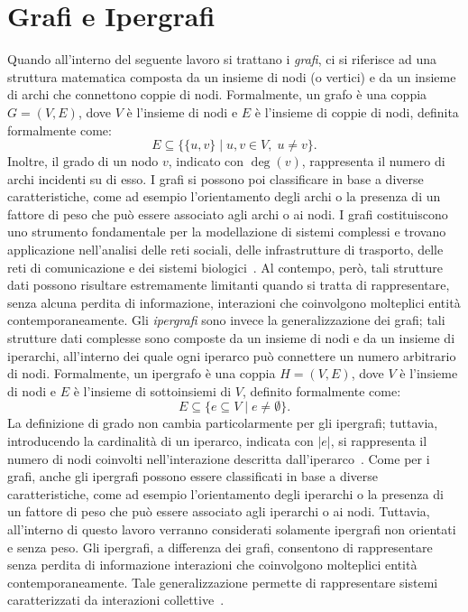 
\section{Grafi e Ipergrafi}\label{sec:grafi_e_ipergrafi}

Quando all'interno del seguente lavoro si trattano i \textit{grafi}, ci si riferisce ad una struttura matematica composta da un insieme di nodi (o vertici) e da un insieme di archi che connettono coppie di nodi.
Formalmente, un grafo è una coppia $G = (V, E)$, dove $V$ è l'insieme di nodi e $E$ è l'insieme di coppie di nodi, definita formalmente come:
\[
    E \subseteq \{\{u,v\} \mid u,v \in V,\; u \neq v\}.
\]
Inoltre, il grado di un nodo $v$, indicato con $\deg(v)$, rappresenta il numero di archi incidenti su di esso.
I grafi si possono poi classificare in base a diverse caratteristiche, come ad esempio l'orientamento degli archi o la presenza di un fattore di peso che può essere associato agli archi o ai nodi.
I grafi costituiscono uno strumento fondamentale per la modellazione di sistemi complessi e trovano applicazione nell'analisi delle reti sociali, delle infrastrutture di trasporto, delle reti di comunicazione e dei sistemi biologici~\cite{newman2018}.\newline
Al contempo, però, tali strutture dati possono risultare estremamente limitanti quando si tratta di rappresentare, senza alcuna perdita di informazione, interazioni che coinvolgono molteplici entità contemporaneamente.\newline
Gli \textit{ipergrafi} sono invece la generalizzazione dei grafi; tali strutture dati complesse sono composte da un insieme di nodi e da un insieme di iperarchi, all'interno dei quale ogni iperarco può connettere un numero arbitrario di nodi.
Formalmente, un ipergrafo è una coppia $H = (V, E)$, dove $V$ è l'insieme di nodi e $E$ è l'insieme di sottoinsiemi di $V$, definito formalmente come:
\[
    E \subseteq \{ e \subseteq V \mid e \neq \emptyset \}.
\]
La definizione di grado non cambia particolarmente per gli ipergrafi; tuttavia, introducendo la cardinalità di un iperarco, indicata con $|e|$, si rappresenta il numero di nodi coinvolti nell'interazione descritta dall'iperarco~\cite{bretto2013}.
Come per i grafi, anche gli ipergrafi possono essere classificati in base a diverse caratteristiche, come ad esempio l'orientamento degli iperarchi o la presenza di un fattore di peso che può essere associato agli iperarchi o ai nodi.
Tuttavia, all'interno di questo lavoro verranno considerati solamente ipergrafi non orientati e senza peso.
Gli ipergrafi, a differenza dei grafi, consentono di rappresentare senza perdita di informazione interazioni che coinvolgono molteplici entità contemporaneamente.
Tale generalizzazione permette di rappresentare sistemi caratterizzati da interazioni collettive~\cite{battiston2020, antelmi2023}.